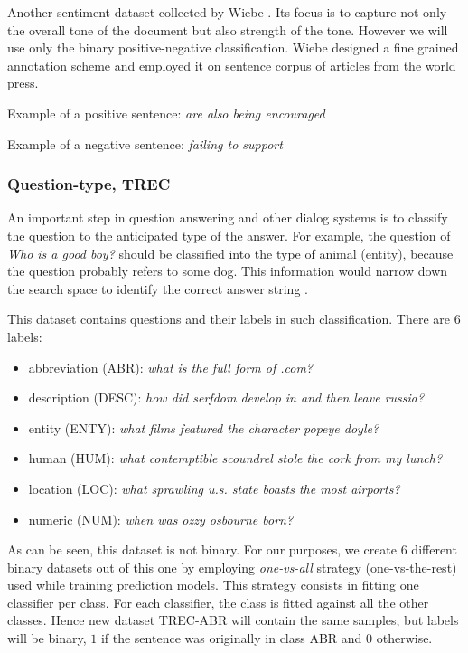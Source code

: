     Another sentiment dataset collected by Wiebe \cite{wiebe2005annotating}.
    Its focus is to capture not only the overall tone of the document but also strength of the tone.
    However we will use only the binary positive-negative classification.
    Wiebe designed a fine grained annotation scheme and employed it on sentence corpus of articles from the world press.
    
    Example of a positive sentence:
    \emph{are also being encouraged}
    
    Example of a negative sentence:
    \emph{failing to support} 

    
    \subsubsection{Question-type, TREC}\label{sec:TREC}
    
    An important step in question answering and other dialog systems is to classify the question to the anticipated type of the answer. 
    For example, the question of \emph{Who is a good boy?} should be classified into the type of animal (entity), because the question probably refers to some dog.  
    This information would narrow down the search space to identify the correct answer string \cite{huang2008question}. 
    
    This dataset contains questions and their labels in such classification.
    There are $6$ labels: 
    
    \begin{itemize}
        \item abbreviation (ABR): \emph{what is the full form of .com?}
        \item description (DESC): \emph{how did serfdom develop in and then leave russia?}
        \item entity (ENTY): \emph{what films featured the character popeye doyle?}
        \item human (HUM): \emph{what contemptible scoundrel stole the cork from my lunch?}
        \item location (LOC): \emph{what sprawling u.s. state boasts the most airports?}
        \item numeric (NUM): \emph{when was ozzy osbourne born?}
    \end{itemize}
    
    As can be seen, this dataset is not binary. 
    For our purposes, we create $6$ different binary datasets out of this one by employing \emph{one-vs-all} strategy (one-vs-the-rest) used while training prediction models.
    This strategy consists in fitting one classifier per class. 
    For each classifier, the class is fitted against all the other classes. 
    Hence new dataset TREC-ABR will contain the same samples, but labels will be binary, $1$ if the sentence was originally in class ABR and $0$ otherwise.
    
